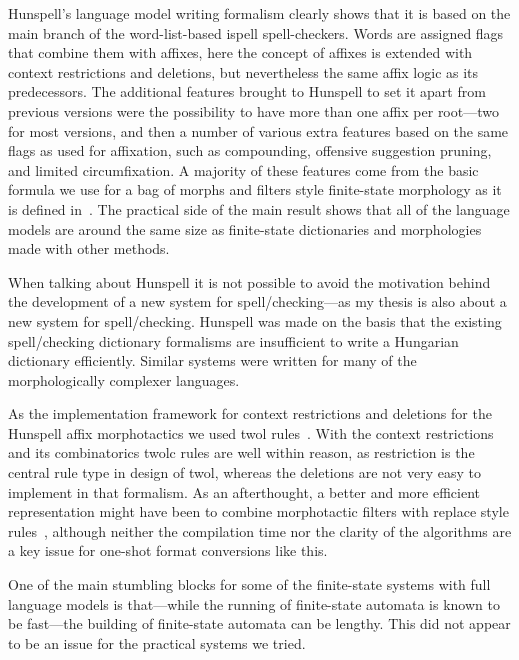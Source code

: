 \documentclass[officiallayout]{unihelcompling}
\begin{document}
Hunspell's language model writing formalism clearly shows that it is based on
the main branch of the word-list-based ispell spell-checkers. Words are
assigned flags that combine them with affixes, here the concept of affixes is
extended with context restrictions and deletions, but nevertheless the same
affix logic as its predecessors. The additional features brought to Hunspell to
set it apart from previous versions were the possibility to have more than one
affix per root---two for most versions, and then a number of various extra
features based on the same flags as used for affixation, such as compounding,
offensive suggestion pruning, and limited circumfixation.  A majority of these
features come from the basic formula we use for a bag of morphs and filters
style finite-state morphology as it is defined in~\citet{linden2009hfst}. The
practical side of the main result shows that all of the language models are
around the same size as finite-state dictionaries and morphologies made with
other methods.

When talking about Hunspell it is not possible to avoid the motivation behind
the development of a new system for spell\-/checking---as my thesis is also
about a new system for spell\-/checking. Hunspell was made on the basis that
the existing spell\-/checking dictionary formalisms are insufficient to write a
Hungarian dictionary efficiently. Similar systems were written for many of the
morphologically complexer languages. 


As the implementation framework for context restrictions and deletions for the
Hunspell affix morphotactics we used twol rules~\citep{karttunen1992two}. With
the context restrictions and its combinatorics twolc rules are well within
reason, as restriction is the central rule type in design of twol, whereas the
deletions are not very easy to implement in that formalism. As an afterthought,
a better and more efficient representation might have been to combine
morphotactic filters with replace style rules~\citep{karttunen1995replace},
although neither the compilation time nor the clarity of the algorithms are a
key issue for one-shot format conversions like this.

One of the main stumbling blocks for some of the finite-state systems with full
language models is that---while the running of finite-state automata is known
to be fast---the building of finite-state automata can be lengthy. This did
not appear to be an issue for the practical systems we tried.
\end{document}

